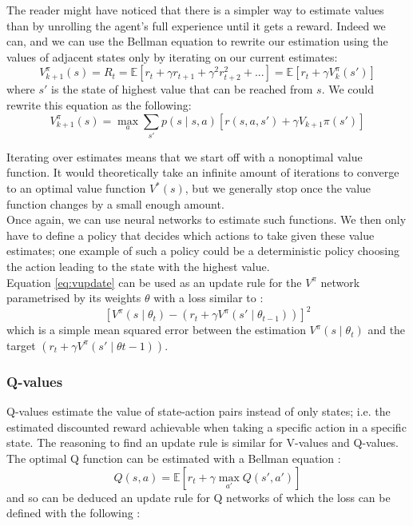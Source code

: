 The reader might have noticed that there is a simpler way to estimate values
than by unrolling the agent's full experience until it gets a reward. Indeed
we can, and we can use the Bellman equation to rewrite our estimation using
the values of adjacent states only by iterating on our current estimates:
\begin{equation}
V_{k+1}^\pi(s) = R_t = \mathbb{E}
   \left[ r_t + \gamma r_{t+1} + \gamma^2 r_{t+2}^2 + ...  \right] = 
   \mathbb{E}\left[ r_t + \gamma V_k^\pi(s')\right]
\label{eq:vupdate}
\end{equation}
where $s'$ is the state of highest value that can be reached from $s$. We could
rewrite this equation as the following:
$$ V_{k+1}^\pi(s) = \max\limits_a \sum\limits_{s'} p(s\mid s,a)[r(s,a,s') + 
\gamma V_{k+1}\pi(s')]$$

Iterating over estimates means that we start off with a nonoptimal value
function. It would theoretically take an infinite amount of iterations to
converge to an optimal value function $V^*(s)$, but we generally stop once the
value function changes by a small enough amount.\\

Once again, we can
use neural networks to estimate such functions. We then only have to define
a policy that decides which actions to take given these value estimates; one
example of such a policy could be a deterministic policy choosing the action
leading to the state with the highest value.\\

Equation \ref{eq:vupdate} can be used as an update rule for the $V^\pi$ network 
parametrised by its weights $\theta$ with a loss similar to :
\begin{equation}
	\label{eq:v_update_rule}
	\left[V^\pi(s\mid \theta_t) -  \left(r_t + \gamma V^\pi(s'\mid \theta_{t-1}) \right)\right]^2 
\end{equation}
\noindent which is a simple mean squared error between the estimation $V^\pi(s\mid \theta_t)$ and
the target $\left(r_t + \gamma V^\pi(s'\mid \theta{t-1}) \right)$.

\subsubsection{Q-values} 
Q-values estimate the value of state-action pairs instead of
only states; i.e. the
estimated discounted reward achievable when taking a specific action in a 
specific state. The reasoning to find an update rule is similar for V-values
and Q-values. The optimal Q function can be estimated with a Bellman equation :
$$ Q(s, a) = \mathbb{E}\left[ r_t + \gamma \max\limits_{a'} Q(s', a') \right]$$
\noindent and so can be deduced an update rule for Q networks of which the loss
can be defined with the following :

